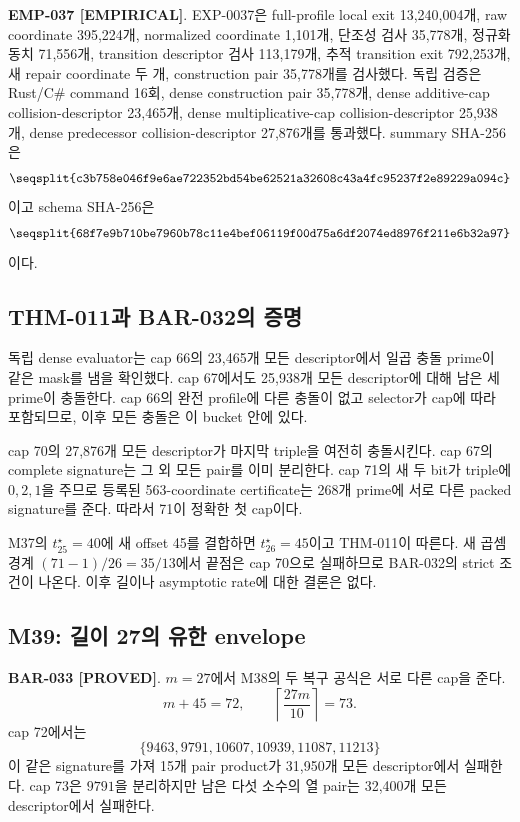 \documentclass[11pt]{article}
\newcommand{\claimstatus}[2]{\textbf{#1 [#2]}}
\begin{document}
\claimstatus{EMP-037}{EMPIRICAL}.
EXP-0037은 full-profile local exit 13,240,004개, raw coordinate
395,224개, normalized coordinate 1,101개, 단조성 검사 35,778개,
정규화 동치 71,556개, transition descriptor 검사 113,179개,
추적 transition exit 792,253개, 새 repair coordinate 두 개,
construction pair 35,778개를 검사했다. 독립 검증은 Rust/C\# command
16회, dense construction pair 35,778개, dense additive-cap
collision-descriptor 23,465개, dense multiplicative-cap
collision-descriptor 25,938개, dense predecessor collision-descriptor
27,876개를 통과했다. summary SHA-256은
\[
\texttt{\seqsplit{c3b758e046f9e6ae722352bd54be62521a32608c43a4fc95237f2e89229a094c}}
\]
이고 schema SHA-256은
\[
\texttt{\seqsplit{68f7e9b710be7960b78c11e4bef06119f00d75a6df2074ed8976f211e6b32a97}}
\]
이다.

\subsection{THM-011과 BAR-032의 증명}

독립 dense evaluator는 cap 66의 23,465개 모든 descriptor에서 일곱
충돌 prime이 같은 mask를 냄을 확인했다. cap 67에서도 25,938개 모든
descriptor에 대해 남은 세 prime이 충돌한다. cap 66의 완전 profile에
다른 충돌이 없고 selector가 cap에 따라 포함되므로, 이후 모든 충돌은
이 bucket 안에 있다.

cap 70의 27,876개 모든 descriptor가 마지막 triple을 여전히
충돌시킨다. cap 67의 complete signature는 그 외 모든 pair를 이미
분리한다. cap 71의 새 두 bit가 triple에 \(0,2,1\)을 주므로 등록된
563-coordinate certificate는 268개 prime에 서로 다른 packed
signature를 준다. 따라서 71이 정확한 첫 cap이다.

M37의 \(t_{25}^\star=40\)에 새 offset 45를 결합하면
\(t_{26}^\star=45\)이고 THM-011이 따른다. 새 곱셈 경계
\((71-1)/26=35/13\)에서 끝점은 cap 70으로 실패하므로 BAR-032의
strict 조건이 나온다. 이후 길이나 asymptotic rate에 대한 결론은
없다.

\subsection{M39: 길이 27의 유한 envelope}

\claimstatus{BAR-033}{PROVED}.
\(m=27\)에서 M38의 두 복구 공식은 서로 다른 cap을 준다.
\[
m+45=72,\qquad
\left\lceil\frac{27m}{10}\right\rceil=73.
\]
cap 72에서는
\[
\{9463,9791,10607,10939,11087,11213\}
\]
이 같은 signature를 가져 15개 pair product가 31,950개 모든
descriptor에서 실패한다. cap 73은 \(9791\)을 분리하지만 남은 다섯
소수의 열 pair는 32,400개 모든 descriptor에서 실패한다.
\end{document}
